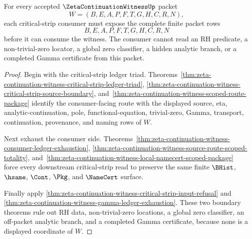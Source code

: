 \begin{theorem}
\label{thm:zeta-continuation-witness-critical-strip-total-ledger}
For every accepted $\ZetaContinuationWitnessUp$ packet
$$
W=(B,E,A,P,F,T,G,H,C,R,N),
$$
each critical-strip consumer must expose the complete finite packet rows
$$
B,E,A,P,F,T,G,H,C,R,N
$$
before it can consume the witness. The consumer cannot read an RH predicate, a non-trivial-zero locator, a global zero classifier, a hidden analytic branch, or a completed Gamma certificate from this packet.
\end{theorem}
\begin{proof}
Begin with the critical-strip ledger triad. Theorems~\ref{thm:zeta-continuation-witness-critical-strip-ledger-triad}, \ref{thm:zeta-continuation-witness-critical-strip-source-boundary}, and~\ref{thm:zeta-continuation-witness-scoped-route-package} identify the consumer-facing route with the displayed source, eta, analytic-continuation, pole, functional-equation, trivial-zero, Gamma, transport, continuation, provenance, and naming rows of $W$.

Next exhaust the consumer side. Theorems~\ref{thm:zeta-continuation-witness-consumer-ledger-exhaustion}, \ref{thm:zeta-continuation-witness-source-route-scoped-totality}, and~\ref{thm:zeta-continuation-witness-local-namecert-scoped-package} force every downstream critical-strip read to preserve the same finite $\BHist$, $\hsame$, $\Cont$, $\Pkg$, and $\NameCert$ surface.

Finally apply \autoref{thm:zeta-continuation-witness-critical-strip-input-refusal} and \autoref{thm:zeta-continuation-witness-gamma-ledger-exhaustion}. These two boundary theorems rule out RH data, non-trivial-zero locations, a global zero classifier, an off-packet analytic branch, and a completed Gamma certificate, because none is a displayed coordinate of $W$.
\end{proof}


